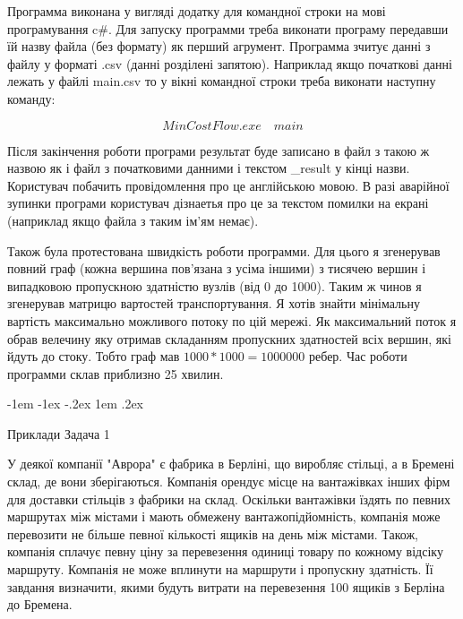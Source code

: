 \documentclass[a4paper,14pt,russian,ukrainian,oneside,final]{extreport}
\makeatletter
\newlength{\fivecharsapprox}
\newlength{\fivecharsapproxs}
\renewcommand\section{%
  \clearpage\@startsection {section}{0}%
    {\fivecharsapproxs}%
    {-1em \@plus -1ex \@minus -.2ex}%
    {1em \@plus .2ex}%
    {\raggedright\hyphenpenalty=10000\normalfont\large\bfseries\MakeUppercase {}}
}
\makeatother
\begin{document}
\indent Программа виконана у вигляді додатку для командної строки на мові програмування c\#.
Для запуску программи треба виконати програму передавши їй назву файла (без формату) як перший агрумент. Программа зчитує данні з файлу у форматі .csv (данні розділені запятою).
Наприклад якщо початкові данні лежать у файлі main.csv то у вікні командної строки треба виконати наступну команду:

$$MinCostFlow.exe \quad main$$

Після закінчення роботи програми результат буде записано в файл з такою ж назвою як і файл з початковими данними і текстом \_result у кінці назви.
Користувач побачить провідомлення про це англійською мовою.
В разі аварійної зупинки програми користувач дізнаетья про це за текстом помилки на екрані (наприклад якщо файла з таким ім'ям немає).

Також була протестована швидкість роботи программи. Для цього я згенерував повний граф (кожна вершина пов'язана з усіма іншими) з тисячею вершин і випадковою пропускною здатністю вузлів (від 0 до 1000).
Таким ж чинов я згенерував матрицю вартостей транспортування.
Я хотів знайти мінімальну вартість максимально можливого потоку по цій мережі.
Як максимальний поток я обрав велечину яку отримав складанням пропускних здатностей всіх вершин, які йдуть до стоку.
Тобто граф мав $1000*1000=1000000$ ребер.
Час роботи программи склав приблизно 25 хвилин.


\section{Приклади}
Задача 1

\indent У деякої компанії "Аврора" є фабрика в Берліні, що виробляє стільці, а в Бремені склад, де вони зберігаються. Компанія орендує місце на вантажівках інших фірм для доставки стільців з фабрики на склад. Оскільки вантажівки їздять по певних маршрутах між містами і мають обмежену вантажопідйомність, компанія може перевозити не більше певної кількості ящиків на день між містами. Також, компанія сплачує певну ціну за перевезення одиниці товару по кожному відсіку маршруту. Компанія не може вплинути на маршрути і пропускну здатність. Її завдання визначити, якими будуть витрати на перевезення 100 ящиків з Берліна до Бремена.
\end{document}
